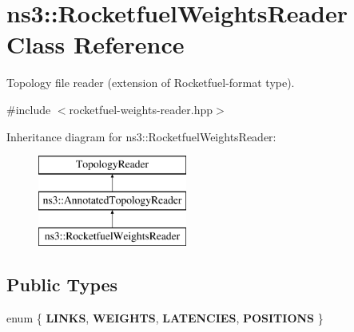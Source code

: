 \hypertarget{classns3_1_1RocketfuelWeightsReader}{}\section{ns3\+:\+:Rocketfuel\+Weights\+Reader Class Reference}
\label{classns3_1_1RocketfuelWeightsReader}


Topology file reader (extension of Rocketfuel-\/format type).  




{\ttfamily \#include $<$rocketfuel-\/weights-\/reader.\+hpp$>$}

Inheritance diagram for ns3\+:\+:Rocketfuel\+Weights\+Reader\+:\begin{figure}[H]
\begin{center}
\leavevmode
\includegraphics[height=3.000000cm]{classns3_1_1RocketfuelWeightsReader}
\end{center}
\end{figure}
\subsection*{Public Types}
\begin{DoxyCompactItemize}
\item 
enum \{ {\bfseries L\+I\+N\+KS}, 
{\bfseries W\+E\+I\+G\+H\+TS}, 
{\bfseries L\+A\+T\+E\+N\+C\+I\+ES}, 
{\bfseries P\+O\+S\+I\+T\+I\+O\+NS}
 \}\hypertarget{classns3_1_1RocketfuelWeightsReader_a7b780036c2288bfdb069e36ae92ad1dd}{}\label{classns3_1_1RocketfuelWeightsReader_a7b780036c2288bfdb069e36ae92ad1dd}

\end{DoxyCompactItemize}
